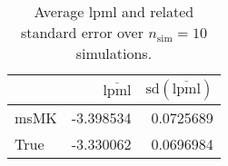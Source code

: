 \begin{table}[H]

\caption{Average lpml and related standard error over $n_{\text{sim}} = 10$ simulations.}
\centering
\begin{tabular}[t]{lrr}
\toprule
  & $\overbar{\text{lpml}}$ & $\text{sd}(\overbar{\text{lpml}})$\\
\midrule
msMK & -3.398534 & 0.0725689\\
True & -3.330062 & 0.0696984\\
\bottomrule
\end{tabular}
\end{table}